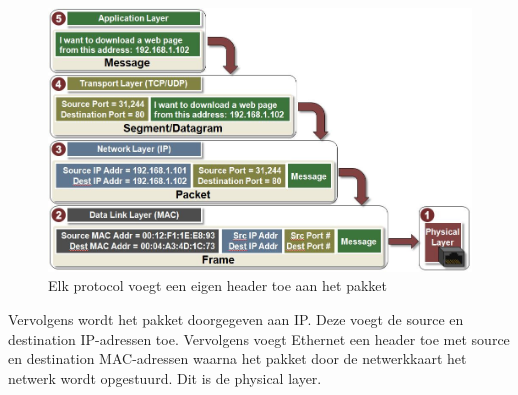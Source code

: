 \begin{figure}
   \centering
   \includegraphics[width=\textwidth]{images/transmit_data.jpg}
   \caption{Elk protocol voegt een eigen header toe aan het pakket}
   \label{fig:transmit-data}
\end{figure}

Vervolgens wordt het pakket doorgegeven aan IP.
Deze voegt de source en destination IP-adressen toe.
Vervolgens voegt Ethernet een header toe met source en destination MAC-adressen waarna het pakket door de netwerkkaart het netwerk wordt opgestuurd.
Dit is de physical layer.


%

